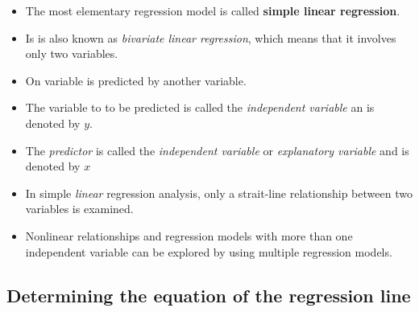\documentclass[]{book}
\providecommand{\tightlist}{%
  \setlength{\itemsep}{0pt}\setlength{\parskip}{0pt}}
\begin{document}
\begin{itemize}
\tightlist
\item
  The most elementary regression model is called \textbf{simple linear regression}.
\item
  Is is also known as \emph{bivariate linear regression}, which means that it involves only two variables.
\item
  On variable is predicted by another variable.
\item
  The variable to to be predicted is called the \emph{independent variable} an is denoted by \(y\).
\item
  The \emph{predictor} is called the \emph{independent variable} or \emph{explanatory variable} and is denoted by \(x\)
\item
  In simple \emph{linear} regression analysis, only a strait-line relationship between two variables is examined.
\item
  Nonlinear relationships and regression models with more than one independent variable can be explored by using multiple regression models.
\end{itemize}

\hypertarget{determining-the-equation-of-the-regression-line}{%
\subsection{Determining the equation of the regression line}\label{determining-the-equation-of-the-regression-line}}
\end{document}
